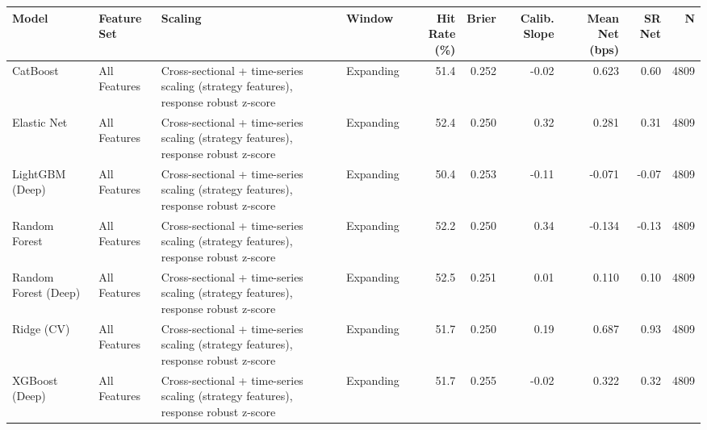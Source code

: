 \begin{tabular}{llllrrrrrr}
\toprule
Model & Feature Set & Scaling & Window & Hit Rate (\%) & Brier & Calib. Slope & Mean Net (bps) & SR Net & N \\
\midrule
CatBoost & All Features & Cross-sectional + time-series scaling (strategy features), response robust z-score & Expanding & 51.4 & 0.252 & -0.02 & 0.623 & 0.60 & 4809 \\
Elastic Net & All Features & Cross-sectional + time-series scaling (strategy features), response robust z-score & Expanding & 52.4 & 0.250 & 0.32 & 0.281 & 0.31 & 4809 \\
LightGBM (Deep) & All Features & Cross-sectional + time-series scaling (strategy features), response robust z-score & Expanding & 50.4 & 0.253 & -0.11 & -0.071 & -0.07 & 4809 \\
Random Forest & All Features & Cross-sectional + time-series scaling (strategy features), response robust z-score & Expanding & 52.2 & 0.250 & 0.34 & -0.134 & -0.13 & 4809 \\
Random Forest (Deep) & All Features & Cross-sectional + time-series scaling (strategy features), response robust z-score & Expanding & 52.5 & 0.251 & 0.01 & 0.110 & 0.10 & 4809 \\
Ridge (CV) & All Features & Cross-sectional + time-series scaling (strategy features), response robust z-score & Expanding & 51.7 & 0.250 & 0.19 & 0.687 & 0.93 & 4809 \\
XGBoost (Deep) & All Features & Cross-sectional + time-series scaling (strategy features), response robust z-score & Expanding & 51.7 & 0.255 & -0.02 & 0.322 & 0.32 & 4809 \\
\bottomrule
\end{tabular}
